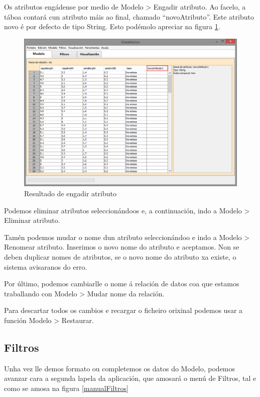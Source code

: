 Os atributos engádense por medio de Modelo \textgreater{} Engadir atributo. Ao facelo, a táboa contará cun atributo máis ao final, chamado ``novoAtributo''. Este atributo novo é por defecto de tipo String. Esto podémolo apreciar na figura \ref{engadirAtributo}.

\begin{figure}
\centering
\includegraphics[width=\textwidth,height=\textheight,keepaspectratio]{figuras/engadirAtributo}
\caption{Resultado de engadir atributo}
\label{engadirAtributo}
\end{figure}

Podemos eliminar atributos seleccionándoos e, a continuación, indo a Modelo \textgreater{} Eliminar atributo.

Tamén podemos mudar o nome dun atributo seleccionándoo e indo a Modelo \textgreater{} Renomear atributo. Inserimos o novo nome do atributo e aceptamos. Non se deben duplicar nomes de atributos, se o novo nome do atributo xa existe, o sistema avisaranos do erro.

Por último, podemos cambiarlle o nome á relación de datos coa que estamos traballando con Modelo \textgreater{} Mudar nome da relación.

Para descartar todos os cambios e recargar o ficheiro orixinal podemos usar a función Modelo \textgreater{} Restaurar.

\subsection{Filtros}

Unha vez lle demos formato ou completemos os datos do Modelo, podemos avanzar cara a segunda lapela da aplicación, que amosará o menú de Filtros, tal e como se amosa na figura \ref{manualFiltros}

